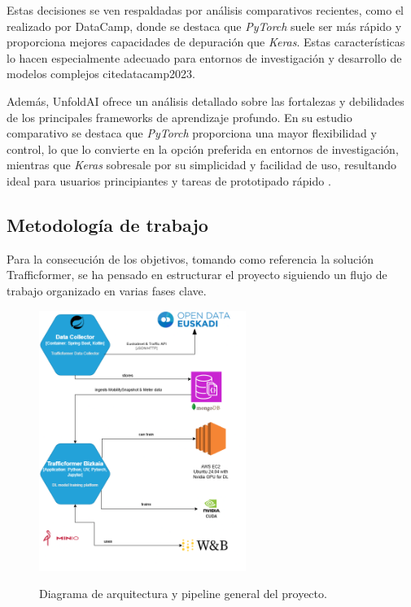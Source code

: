 Estas decisiones se ven respaldadas por análisis comparativos recientes, como el realizado por DataCamp, donde se destaca que \textit{PyTorch} suele ser más rápido y proporciona mejores capacidades de depuración que \textit{Keras}. Estas características lo hacen especialmente adecuado para entornos de investigación y desarrollo de modelos complejos cite{datacamp2023}.

Además, UnfoldAI ofrece un análisis detallado sobre las fortalezas y debilidades de los principales frameworks de aprendizaje profundo. En su estudio comparativo se destaca que \textit{PyTorch} proporciona una mayor flexibilidad y control, lo que lo convierte en la opción preferida en entornos de investigación, mientras que \textit{Keras} sobresale por su simplicidad y facilidad de uso, resultando ideal para usuarios principiantes y tareas de prototipado rápido \cite{unfoldai2024}.

\subsection{Metodología de trabajo}

Para la consecución de los objetivos, tomando como referencia la solución Trafficformer, se ha pensado en estructurar el proyecto siguiendo un flujo de trabajo organizado en varias fases clave.

\begin{figure}[H]
	\centering
	\caption{Diagrama de arquitectura y pipeline general del proyecto.}
	\includegraphics[width=0.6\textwidth]{includes/cap4/trafficformer_arch.png}
	\label{fig:pipeline-general}
\end{figure}

